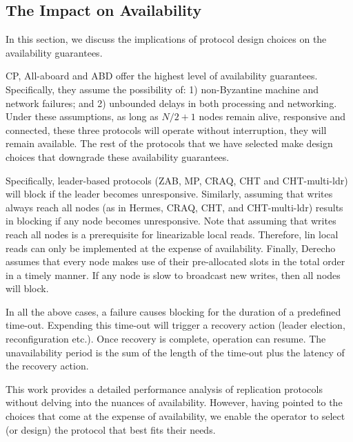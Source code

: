 \subsection{The Impact on Availability}\label{sec:fail}
In this section, we discuss the implications of protocol design choices on the availability guarantees.



CP, All-aboard and ABD offer the highest level of availability guarantees.
Specifically, they assume the possibility of: 
1) non-Byzantine machine and network failures; and 
2) unbounded delays in both processing and networking. 
Under these assumptions, as long as $N/2 + 1$ nodes remain alive, responsive and connected, these three protocols will operate without interruption, \ie they will remain available.
The rest of the protocols that we have selected 
make design choices that downgrade these availability guarantees.


Specifically, leader-based protocols (ZAB, MP, CRAQ, CHT and CHT-multi-ldr)  will block if the leader becomes unresponsive.
Similarly, assuming that writes always reach all nodes (as in Hermes, CRAQ, CHT, and CHT-multi-ldr) results in blocking if any node becomes unresponsive.
Note that assuming that writes reach all nodes is a prerequisite for  linearizable local reads. Therefore, lin local reads can only be implemented at the expense of availability.
Finally, Derecho assumes that every node makes use of their pre-allocated slots in the total order in a timely manner. If any node is slow to broadcast new writes, then all nodes will block.


In all the above cases, a failure causes blocking for the duration of a predefined time-out. Expending this time-out will trigger a recovery action (\eg leader election, reconfiguration etc.). Once recovery is complete, operation can resume. 
The unavailability period is the sum of the length of the time-out plus the latency of the recovery action. 

This work provides a detailed performance analysis of replication protocols without delving into the nuances of availability. However, having pointed to the choices that come at the expense of availability, we enable the operator to select (or design) the protocol that best fits their needs.














